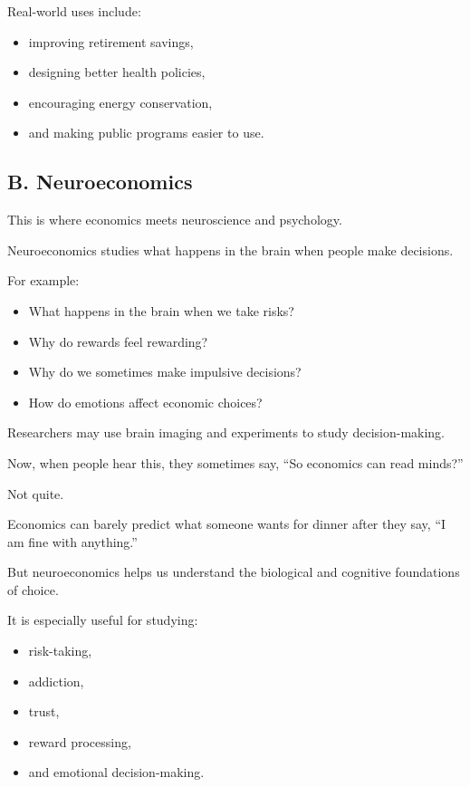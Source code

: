 \documentclass[12pt]{article}
\begin{document}
Real-world uses include:
\begin{itemize}[leftmargin=2em]
    \item improving retirement savings,
    \item designing better health policies,
    \item encouraging energy conservation,
    \item and making public programs easier to use.
\end{itemize}

\subsection*{B. Neuroeconomics}

This is where economics meets neuroscience and psychology.

Neuroeconomics studies what happens in the brain when people make decisions.

For example:
\begin{itemize}[leftmargin=2em]
    \item What happens in the brain when we take risks?
    \item Why do rewards feel rewarding?
    \item Why do we sometimes make impulsive decisions?
    \item How do emotions affect economic choices?
\end{itemize}

Researchers may use brain imaging and experiments to study decision-making.

Now, when people hear this, they sometimes say, ``So economics can read minds?''

Not quite.

Economics can barely predict what someone wants for dinner after they say, ``I am fine with anything.''

But neuroeconomics helps us understand the biological and cognitive foundations of choice.

It is especially useful for studying:
\begin{itemize}[leftmargin=2em]
    \item risk-taking,
    \item addiction,
    \item trust,
    \item reward processing,
    \item and emotional decision-making.
\end{itemize}
\end{document}
